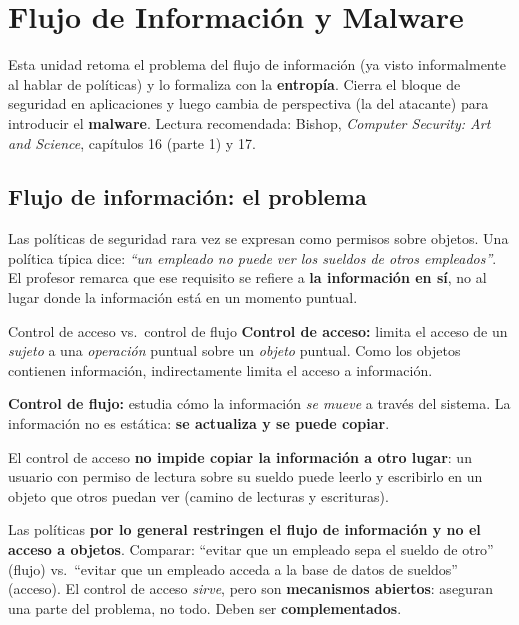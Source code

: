 \documentclass[../main.tex]{subfiles}
\begin{document}
\section{Flujo de Información y Malware}

Esta unidad retoma el problema del flujo de información (ya visto informalmente
al hablar de políticas) y lo formaliza con la \textbf{entropía}. Cierra el bloque
de seguridad en aplicaciones y luego cambia de perspectiva (la del atacante) para
introducir el \textbf{malware}. Lectura recomendada: Bishop, \textit{Computer
Security: Art and Science}, capítulos 16 (parte 1) y 17.

\subsection{Flujo de información: el problema}

Las políticas de seguridad rara vez se expresan como permisos sobre objetos. Una
política típica dice: \emph{``un empleado no puede ver los sueldos de otros
empleados''}. El profesor remarca que ese requisito se refiere a \textbf{la
información en sí}, no al lugar donde la información está en un momento puntual.

\begin{definicion}{Control de acceso vs.\ control de flujo}
\textbf{Control de acceso:} limita el acceso de un \emph{sujeto} a una
\emph{operación} puntual sobre un \emph{objeto} puntual. Como los objetos
contienen información, indirectamente limita el acceso a información.

\textbf{Control de flujo:} estudia cómo la información \emph{se mueve} a través
del sistema. La información no es estática: \textbf{se actualiza y se puede copiar}.
\end{definicion}

El control de acceso \textbf{no impide copiar la información a otro lugar}: un
usuario con permiso de lectura sobre su sueldo puede leerlo y escribirlo en un
objeto que otros puedan ver (camino de lecturas y escrituras).

\begin{destacado}
Las políticas \textbf{por lo general restringen el flujo de información y no el
acceso a objetos}. Comparar: ``evitar que un empleado sepa el sueldo de otro''
(flujo) vs.\ ``evitar que un empleado acceda a la base de datos de sueldos''
(acceso). El control de acceso \emph{sirve}, pero son \textbf{mecanismos abiertos}:
aseguran una parte del problema, no todo. Deben ser \textbf{complementados}.
\end{destacado}
\end{document}
